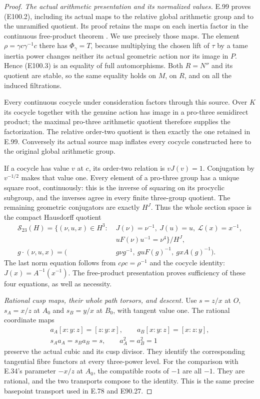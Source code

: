 \begin{proof}
\emph{The actual arithmetic presentation and its normalized values.}
E.99 proves (E100.2), including its actual maps
to the relative global arithmetic group and
to the unramified quotient. Its proof retains
the maps on each inertia factor in the
continuous free-product theorem
\cite[Lemma1.1, Theorem2.4 and their proofs,
pp4--5,13--15]{E_WingbergRiemann}.
We use precisely those maps. The element
$\rho=\gamma c\gamma^{-1}c$ there has
$\Phi_\gamma=T$, because multiplying the chosen
lift of $\tau$ by a tame inertia power changes
neither its actual geometric action nor its
image in $P$. Hence (E100.3) is an equality
of full automorphisms. Both $R=N''$ and its
quotient are stable, so the same equality
holds on $M$, on $R$, and on all the induced
filtrations.

Every continuous cocycle under consideration
factors through this source. Over $K$ its
cocycle together with the genuine action
has image in a pro-three semidirect product;
the maximal pro-three arithmetic quotient
therefore supplies the factorization. The
relative order-two quotient is then exactly
the one retained in E.99. Conversely its
actual source map inflates every cocycle
constructed here to the original global
arithmetic group.

If a cocycle has value $v$ at $c$, its
order-two relation is $vJ(v)=1$.
Conjugation by $v^{-1/2}$ makes that value
one. Every element of a pro-three group has
a unique square root, continuously: this
is the inverse of squaring on its procyclic
subgroup, and the inverses agree in every
finite three-group quotient. The remaining
geometric conjugators are exactly $H^J$.
Thus the whole section space is the compact
Hausdorff quotient
\[
\begin{split}
 \mathscr S_{23}(H)=
 \{(\nu,u,x)\in H^3:\;&J(\nu)=\nu^{-1},\
             J(u)=u,\ \mathcal L(x)=x^{-1},\\
             &uF(\nu)u^{-1}=\nu^4\}/H^J,\\
 g\cdot(\nu,u,x)=
       (&g\nu g^{-1},\ g uF(g)^{-1},\
                         g xA(g)^{-1}).
\end{split}
 \tag{E100.14}
\]
The last norm equation follows from
$c\rho c=\rho^{-1}$ and the cocycle identity:
$J(x)=A^{-1}(x^{-1})$. The free-product
presentation proves sufficiency of these
four equations, as well as necessity.

\emph{Rational cusp maps, their whole path torsors, and descent.}
Use $s=z/x$ at $O$, $s_A=x/z$ at $A_0$
and $s_B=y/x$ at $B_0$, with tangent value
one. The rational coordinate maps
\[
 \begin{gathered}
 a_A[x:y:z]=[z:y:x],\qquad a_B[x:y:z]=[x:z:y],\\
 s_Aa_A=s_Ba_B=s,\qquad a_A^2=a_B^2=1
 \end{gathered}
 \tag{E100.15}
\]
preserve the actual cubic and its cusp divisor.
They identify the corresponding tangential
fibre functors at every three-power level.
For the comparison with E.34's parameter
$-x/z$ at $A_0$, the compatible roots of
$-1$ are all $-1$. They are rational, and
the two transports compose to the identity.
This is the same precise basepoint transport
used in E.78 and E90.27.


\end{proof}
